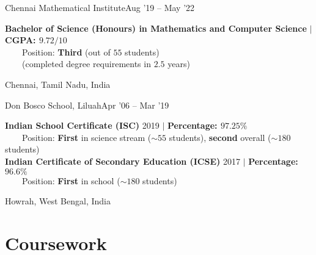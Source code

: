 \resumeSubheading
{Chennai Mathematical Institute}{Aug '19 -- May '22}
{\begin{minipage}{15cm} \color{grey}\textbf{Bachelor of Science (Honours) in Mathematics and Computer Science} $|$ \textbf{CGPA: $9.72/10$} \\
$\phantom{\qquad}$Position: \textbf{Third} (out of $55$ students)\\
$\phantom{\qquad}$(completed degree requirements in $2.5$ years) \end{minipage}
}{Chennai, Tamil Nadu, India}
\vspace{-5pt}
      
\resumeSubheading
{Don Bosco School, Liluah}{Apr '06 -- Mar '19}
{\begin{minipage}{15cm} \color{grey}\textbf{Indian School Certificate (ISC)} 2019 $|$ \textbf{Percentage: $97.25\%$} \\
$\phantom{\qquad}$Position: \textbf{First} in science stream ($\sim55$ students), \textbf{second} overall ($\sim180$ students) \\ 
\textbf{Indian Certificate of Secondary Education (ICSE)} 2017 $|$ \textbf{Percentage: $96.6\%$} \\
$\phantom{\qquad}$Position: \textbf{First} in school ($\sim180$ students) \end{minipage}
}{Howrah, West Bengal, India}

\section{Coursework}

